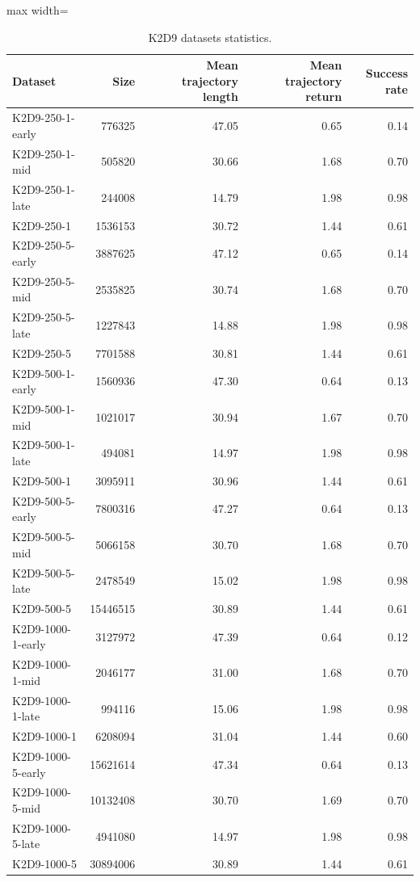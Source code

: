 \documentclass{article}
\begin{document}
\begin{table}[ht]
    \label{tab:k2d9_stats}
    \begin{center}
    \caption{K2D9 datasets statistics.}
    \begin{small}
    \begin{adjustbox}{max width=\columnwidth}
		\begin{tabular}{l|rrrr}
		\toprule
	\textbf{Dataset} & \textbf{Size} & \textbf{Mean trajectory length} & \textbf{Mean trajectory return} & \textbf{Success rate}\\
\midrule
K2D9-250-1-early & 776325 & 47.05 & 0.65 & 0.14\\
K2D9-250-1-mid & 505820 & 30.66 & 1.68 & 0.70\\
K2D9-250-1-late & 244008 & 14.79 & 1.98 & 0.98\\
K2D9-250-1 & 1536153 & 30.72 & 1.44 & 0.61\\
\midrule
K2D9-250-5-early & 3887625 & 47.12 & 0.65 & 0.14\\
K2D9-250-5-mid & 2535825 & 30.74 & 1.68 & 0.70\\
K2D9-250-5-late & 1227843 & 14.88 & 1.98 & 0.98\\
K2D9-250-5 & 7701588 & 30.81 & 1.44 & 0.61\\
\midrule
K2D9-500-1-early & 1560936 & 47.30 & 0.64 & 0.13\\
K2D9-500-1-mid & 1021017 & 30.94 & 1.67 & 0.70\\
K2D9-500-1-late & 494081 & 14.97 & 1.98 & 0.98\\
K2D9-500-1 & 3095911 & 30.96 & 1.44 & 0.61\\
\midrule
K2D9-500-5-early & 7800316 & 47.27 & 0.64 & 0.13\\
K2D9-500-5-mid & 5066158 & 30.70 & 1.68 & 0.70\\
K2D9-500-5-late & 2478549 & 15.02 & 1.98 & 0.98\\
K2D9-500-5 & 15446515 & 30.89 & 1.44 & 0.61\\
\midrule
K2D9-1000-1-early & 3127972 & 47.39 & 0.64 & 0.12\\
K2D9-1000-1-mid & 2046177 & 31.00 & 1.68 & 0.70\\
K2D9-1000-1-late & 994116 & 15.06 & 1.98 & 0.98\\
K2D9-1000-1 & 6208094 & 31.04 & 1.44 & 0.60\\
\midrule
K2D9-1000-5-early & 15621614 & 47.34 & 0.64 & 0.13\\
K2D9-1000-5-mid & 10132408 & 30.70 & 1.69 & 0.70\\
K2D9-1000-5-late & 4941080 & 14.97 & 1.98 & 0.98\\
K2D9-1000-5 & 30894006 & 30.89 & 1.44 & 0.61\\
\bottomrule
\end{tabular}
        \end{adjustbox}
    \end{small}
    \end{center}
    \vskip -0.1in
\end{table}
\end{document}
